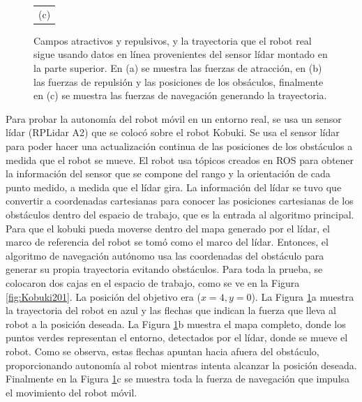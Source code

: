 \begin{figure}
\begin{tabular}{c}
      \multicolumn{1}{c}{(c)}
    \end{tabular}
  \captionsetup{font=footnotesize}
    \caption{\label{f:kbki_autonomo}Campos atractivos y repulsivos, y la trayectoria que el 
    robot real sigue usando datos en línea provenientes del sensor lídar montado en la parte 
    superior. En (a) se muestra las fuerzas de atracción, en (b) las fuerzas de repulsión y 
    las posiciones de los obsáculos, finalmente en (c) se muestra las fuerzas de navegación 
    generando la trayectoria.}
\end{figure}


Para probar la autonomía del robot móvil en un entorno real, se usa un sensor lídar 
(RPLidar A2) que se colocó sobre el robot Kobuki. Se usa el sensor lídar para poder 
hacer una actualización continua de las posiciones de los obstáculos a medida que el 
robot se mueve. El robot usa tópicos creados en ROS para obtener la información del 
sensor que se compone del rango y la orientación de cada punto medido, a medida que 
el lídar gira. La información del lídar se tuvo que convertir a coordenadas cartesianas 
para conocer las posiciones cartesianas de los obstáculos dentro del espacio de trabajo, 
que es la entrada al algoritmo principal. Para que el kobuki pueda moverse dentro del 
mapa generado por el lídar, el marco de referencia del robot se tomó como el marco del 
lídar. Entonces, el algoritmo de navegación autónomo usa las coordenadas del obstáculo 
para generar su propia trayectoria evitando obstáculos. Para toda la prueba, se colocaron 
dos cajas en el espacio de trabajo, como se ve en la Figura \ref{fig:Kobuki201}. La 
posición del objetivo era ($x = 4, y = 0$). La Figura \ref{f:kbki_autonomo}a muestra 
la trayectoria del robot en azul y las flechas que indican la fuerza que lleva al robot a la 
posición deseada. La Figura \ref{f:kbki_autonomo}b muestra el mapa completo, donde los 
puntos verdes representan el entorno, detectados por el lídar, donde se mueve el robot. Como 
se observa, estas flechas apuntan hacia afuera del obstáculo, proporcionando autonomía al 
robot mientras intenta alcanzar la posición deseada. Finalmente en la Figura 
\ref{f:kbki_autonomo}c se muestra toda la fuerza de navegación que impulsa el movimiento 
del robot móvil.

